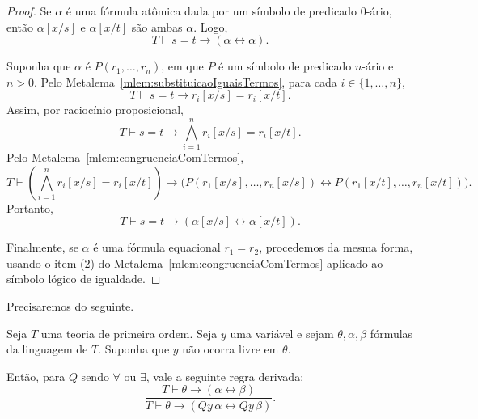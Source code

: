 \begin{proof}
    Se $\alpha$ é uma fórmula atômica dada por um símbolo de predicado $0$-ário, então $\alpha[x/s]$ e $\alpha[x/t]$ são ambas $\alpha$.
    Logo,
    \[
        T\vdash s=t\rightarrow(\alpha\leftrightarrow\alpha).
    \]

    Suponha que $\alpha$ é $P(r_1,\dots,r_n)$, em que $P$ é um símbolo de predicado $n$-ário e $n>0$.
    Pelo Metalema~\ref{mlem:substituicaoIguaisTermos}, para cada $i\in\{1,\dots,n\}$,
    \[
        T\vdash s=t\rightarrow r_i[x/s]=r_i[x/t].
    \]
    Assim, por raciocínio proposicional,
    \[
        T\vdash
        s=t\rightarrow
        \bigwedge_{i=1}^n r_i[x/s]=r_i[x/t].
    \]
    Pelo Metalema~\ref{mlem:congruenciaComTermos},
    \[
        T\vdash
        \left(\bigwedge_{i=1}^n r_i[x/s]=r_i[x/t]\right)
        \rightarrow
        \bigl(P(r_1[x/s],\dots,r_n[x/s])
        \leftrightarrow
        P(r_1[x/t],\dots,r_n[x/t])\bigr).
    \]
    Portanto,
    \[
        T\vdash s=t\rightarrow(\alpha[x/s]\leftrightarrow\alpha[x/t]).
    \]

    Finalmente, se $\alpha$ é uma fórmula equacional $r_1=r_2$, procedemos da mesma forma, usando o item (2) do Metalema~\ref{mlem:congruenciaComTermos} aplicado ao símbolo lógico de igualdade.
\end{proof}

Precisaremos do seguinte.

\begin{metalemma}\label{mlem:quantificacaoEquivalenciasSobHipotese}
    Seja $T$ uma teoria de primeira ordem.
    Seja $y$ uma variável e sejam $\theta,\alpha,\beta$ fórmulas da linguagem de $T$.
    Suponha que $y$ não ocorra livre em $\theta$.

    Então, para $Q$ sendo $\forall$ ou $\exists$, vale a seguinte regra derivada:
    \[
        \frac{T\vdash \theta\rightarrow(\alpha\leftrightarrow\beta)}
             {T\vdash \theta\rightarrow(Qy\,\alpha\leftrightarrow Qy\,\beta)}.
    \]
\end{metalemma}

